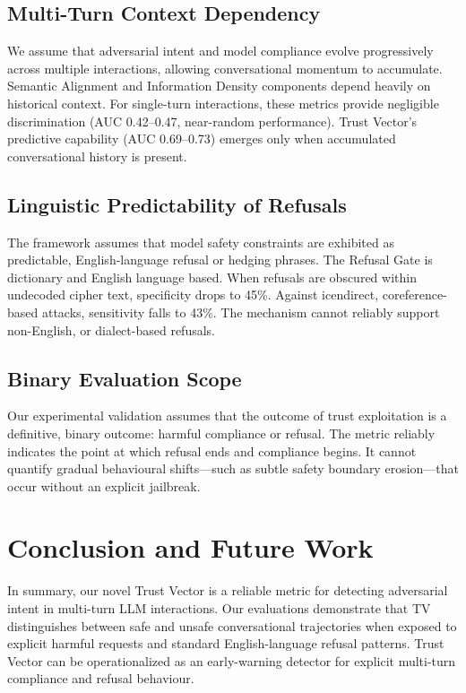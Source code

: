 \documentclass[conference]{IEEEtran}
\begin{document}
\subsection{Multi-Turn Context Dependency}
We assume that adversarial intent and model compliance evolve progressively across multiple interactions, allowing conversational momentum to accumulate. Semantic Alignment and Information Density components depend heavily on historical context. For single-turn interactions, these metrics provide negligible discrimination (AUC 0.42--0.47, near-random performance). Trust Vector's predictive capability (AUC 0.69--0.73) emerges only when accumulated conversational history is present.

\subsection{Linguistic Predictability of Refusals}
The framework assumes that model safety constraints are exhibited as predictable, English-language refusal or hedging phrases.
The Refusal Gate is dictionary and English language based. When refusals are obscured within undecoded cipher text, specificity drops to 45\%. Against icendirect, coreference-based attacks, sensitivity falls to 43\%. The mechanism cannot reliably support non-English, or dialect-based refusals.


\subsection{Binary Evaluation Scope}
 Our experimental validation assumes that the outcome of trust exploitation is a definitive, binary outcome: harmful compliance or refusal. The metric reliably indicates the point at which refusal ends and compliance begins. It cannot quantify gradual behavioural shifts—such as subtle safety boundary erosion—that occur without an explicit jailbreak.


\section{Conclusion and Future Work}

In summary, our novel Trust Vector is a reliable metric for detecting adversarial intent in multi-turn LLM interactions. Our evaluations demonstrate that TV distinguishes between safe and unsafe conversational trajectories when exposed to explicit harmful requests and standard English-language refusal patterns. Trust Vector can be operationalized as an early-warning detector for explicit multi-turn compliance and refusal behaviour.
\end{document}
